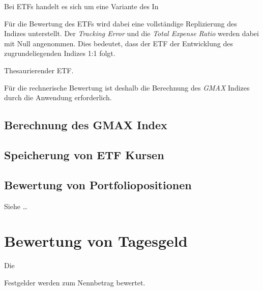 \documentclass[12pt, a4paper]{article}
\begin{document}
Bei ETFs handelt es sich um eine Variante des In



Für die Bewertung des ETFs wird dabei eine vollständige Replizierung des Indizes unterstellt.
Der \textit{Tracking Error} und die \textit{Total Expense Ratio} werden dabei mit Null angenommen.
Dies bedeutet, dass der ETF der Entwicklung des zugrundeliegenden Indizes 1:1 folgt.

Thesaurierender ETF.

Für die rechnerische Bewertung ist deshalb die Berechnung des \textit{GMAX} Indizes durch die Anwendung erforderlich.

\subsection{Berechnung des {GMAX} Index}

\subsection{Speicherung von {ETF} Kursen}

\subsection{Bewertung von Portfoliopositionen}
Siehe \dots



\section{Bewertung von Tagesgeld}
\label{sec:bewertung_von_festgeldern}

Die




Festgelder werden zum Nennbetrag bewertet.
\end{document}
